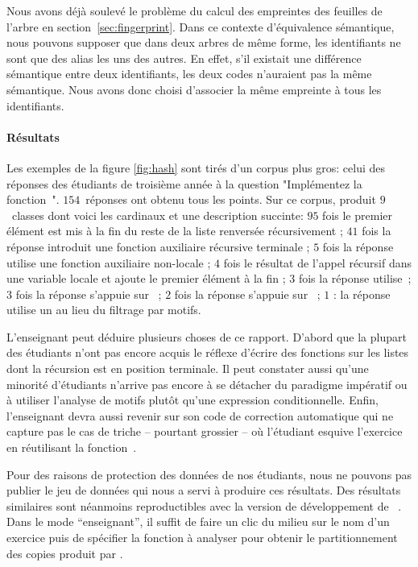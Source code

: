 Nous avons déjà soulevé le problème du calcul des empreintes des
feuilles de l'arbre en section~\ref{sec:fingerprint}. Dans ce contexte
d'équivalence sémantique, nous pouvons supposer que dans deux arbres
de même forme, les identifiants ne sont que des alias les uns des
autres. En effet, s'il existait une différence sémantique entre deux
identifiants, les deux codes n'auraient pas la même sémantique.  Nous
avons donc choisi d'associer la même empreinte à tous les
identifiants.  

\paragraph{Résultats}

Les exemples de la figure \ref{fig:hash} sont tirés d'un corpus plus
gros: celui des réponses des étudiants de troisième année à la
question "Implémentez la fonction~". $154$~réponses ont
obtenu tous les points. Sur ce corpus, {\Asak} produit $9$~classes
dont voici les cardinaux et une description succinte:
$95$ fois le premier élément est mis à la fin du reste de la liste renversée récursivement ;
$41$ fois la réponse introduit une fonction auxiliaire récursive terminale ;
$5$ fois la réponse utilise une fonction auxiliaire non-locale ;
$4$ fois le résultat de l'appel récursif dans une variable locale et ajoute le premier élément à la fin ;
$3$ fois la réponse utilise~;
$3$ fois la réponse s'appuie sur~ ;
$2$ fois la réponse s'appuie sur~ ;
$1$ : la réponse utilise un  au lieu du filtrage par motifs.

L'enseignant peut déduire plusieurs choses de ce rapport. D'abord que
la plupart des étudiants n'ont pas encore acquis le réflexe d'écrire
des fonctions sur les listes dont la récursion est en position
terminale. Il peut constater aussi qu'une minorité d'étudiants
n'arrive pas encore à se détacher du paradigme impératif ou à utiliser
l'analyse de motifs plutôt qu'une expression conditionnelle. Enfin,
l'enseignant devra aussi revenir sur son code de correction automatique
qui ne capture pas le cas de triche -- pourtant grossier -- où l'étudiant
esquive l'exercice en réutilisant la fonction~.

Pour des raisons de protection des données de nos étudiants, nous ne
pouvons pas publier le jeu de données qui nous a servi à produire ces
résultats. Des résultats similaires sont néanmoins reproductibles avec
la version de développement de {\LearnOCaml}~\cite{learnocaml}. Dans le
mode ``enseignant'', il suffit de faire un clic du milieu sur le nom
d'un exercice puis de spécifier la fonction à analyser pour obtenir le
partitionnement des copies produit par {\Asak}.
